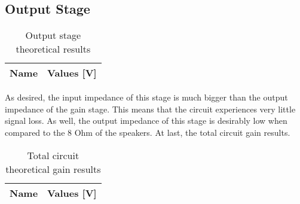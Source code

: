 \subsection{Output Stage}
\begin{table}[h]
  \centering
  \begin{tabular}{|l|r|}
    \hline    
    {\bf Name} & {\bf Values [V]} \\ \hline
     
  \end{tabular}
  \caption{Output stage theoretical results}
  \label{tab:output}
\end{table}
As desired, the input impedance of this stage is much bigger than the output impedance of the gain stage. This means that the circuit experiences very little signal loss. As well, the output impedance of this stage is desirably low when compared to the 8 Ohm of the speakers.
At last, the total circuit gain results.
\begin{table}[h]
  \centering
  \begin{tabular}{|l|r|}
    \hline    
    {\bf Name} & {\bf Values [V]} \\ \hline
     
  \end{tabular}
  \caption{Total circuit theoretical gain results}
  \label{tab:output}
\end{table}
